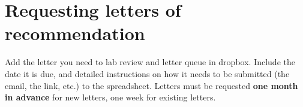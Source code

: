 \documentclass[12pt]{article}
\begin{document}
\section{Requesting letters of recommendation}
Add the letter you need to lab review and letter queue in dropbox.
Include the date it is due, and detailed instructions on how it
needs to be submitted (the email, the link, etc.) to the
spreadsheet. Letters must be requested \textbf{one month in advance}
for new letters, one week for existing letters.
\end{document}
